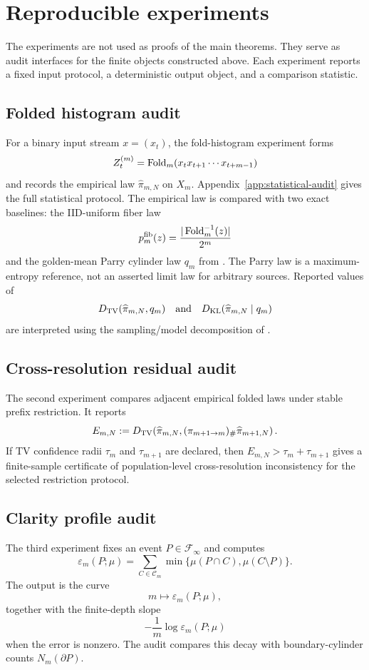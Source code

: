 \section{Reproducible experiments}
\label{sec:experiments}

The experiments are not used as proofs of the main theorems.  They serve as audit interfaces for the finite objects constructed above.  Each experiment reports a fixed input protocol, a deterministic output object, and a comparison statistic.

\subsection{Folded histogram audit}
For a binary input stream \(x=(x_t)\), the fold-histogram experiment forms
\[
Z_t^{(m)}=\operatorname{Fold}_m(x_tx_{t+1}\cdots x_{t+m-1})
\]
and records the empirical law \(\widehat\pi_{m,N}\) on \(X_m\).  Appendix~\ref{app:statistical-audit} gives the full statistical protocol.  The empirical law is compared with two exact baselines: the IID-uniform fiber law
\[
p_m^{\mathrm{fib}}(z)=\frac{|\operatorname{Fold}_m^{-1}(z)|}{2^m}
\]
and the golden-mean Parry cylinder law \(q_m\) from .  The Parry law is a maximum-entropy reference, not an asserted limit law for arbitrary sources.  Reported values of
\[
D_{\mathrm{TV}}(\widehat\pi_{m,N},q_m)
\quad\text{and}\quad
D_{\mathrm{KL}}(\widehat\pi_{m,N}\mid q_m)
\]
are interpreted using the sampling/model decomposition of .

\subsection{Cross-resolution residual audit}
The second experiment compares adjacent empirical folded laws under stable prefix restriction.  It reports
\[
E_{m,N}:=
D_{\mathrm{TV}}\!\left(
\widehat\pi_{m,N},
(\pi_{m+1\to m})_\#\widehat\pi_{m+1,N}
\right).
\]
If TV confidence radii \(\tau_m\) and \(\tau_{m+1}\) are declared, then \(E_{m,N}>\tau_m+\tau_{m+1}\) gives a finite-sample certificate of population-level cross-resolution inconsistency for the selected restriction protocol.

\subsection{Clarity profile audit}
The third experiment fixes an event \(P\in\mathcal F_\infty\) and computes
\[
\varepsilon_m(P;\mu)=
\sum_{C\in\mathcal C_m}
\min\{\mu(P\cap C),\mu(C\setminus P)\}.
\]
The output is the curve
\[
m\longmapsto \varepsilon_m(P;\mu),
\]
together with the finite-depth slope
\[
-\frac1m\log \varepsilon_m(P;\mu)
\]
when the error is nonzero.  The audit compares this decay with boundary-cylinder counts \(N_m(\partial P)\).

